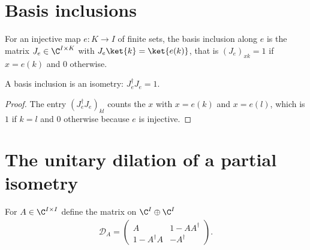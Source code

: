 \section{Basis inclusions}
\label{sec:gate_basis_inclusion}

\begin{definition}
    \label{def:gate_basis_inclusion}
    \leanok
    For an injective map $e:K\to I$ of finite sets, the basis inclusion along $e$ is the matrix
    $J_e\in\C^{I\times K}$ with $J_e\ket{k}=\ket{e(k)}$, that is $(J_e)_{xk}=1$ if $x=e(k)$
    and $0$ otherwise.
\end{definition}

\begin{lemma}
    \label{lem:gate_basis_inclusion_isometry}
    \leanok
    A basis inclusion is an isometry: $J_e^\dagger J_e=1$.
\end{lemma}
\begin{proof}\leanok
    The entry $(J_e^\dagger J_e)_{kl}$ counts the $x$ with $x=e(k)$ and $x=e(l)$, which is $1$
    if $k=l$ and $0$ otherwise because $e$ is injective.
\end{proof}

\section{The unitary dilation of a partial isometry}
\label{sec:gate_dilation}

\begin{definition}
    \label{def:gate_partial_isometry_dilation}
    \leanok
    For $A\in\C^{I\times I}$ define the matrix on $\C^I\oplus\C^I$
    \begin{align}
        \mathcal D_A=
        \begin{pmatrix}
            A             & 1-AA^\dagger \\
            1-A^\dagger A & -A^\dagger
        \end{pmatrix}.
    \end{align}
\end{definition}

